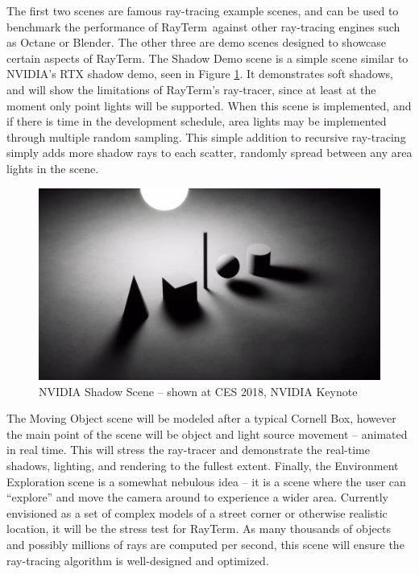 \documentclass[11pt]{article}
\newcommand{\name}{{\sc RayTerm}}
\begin{document}
The first two scenes are famous ray-tracing example scenes, and can be used to benchmark the performance of \name\ against other ray-tracing engines such as Octane or Blender.
The other three are demo scenes designed to showcase certain aspects of \name.
The Shadow Demo scene is a simple scene similar to NVIDIA's RTX shadow demo, seen in Figure \ref{fig:nvidia_shadows}.
It demonstrates soft shadows, and will show the limitations of \name's ray-tracer, since at least at the moment only point lights will be supported.
When this scene is implemented, and if there is time in the development schedule, area lights may be implemented through multiple random sampling.
This simple addition to recursive ray-tracing simply adds more shadow rays to each scatter, randomly spread between any area lights in the scene.

\begin{figure}[htb]
  \centering
  \includegraphics[width=\textwidth]{resources/nvidia_shadows}
  \caption{NVIDIA Shadow Scene -- shown at CES 2018, NVIDIA Keynote}
  \label{fig:nvidia_shadows}
\end{figure}

The Moving Object scene will be modeled after a typical Cornell Box, however the main point of the scene will be object and light source movement -- animated in real time.
This will stress the ray-tracer and demonstrate the real-time shadows, lighting, and rendering to the fullest extent.
Finally, the Environment Exploration scene is a somewhat nebulous idea -- it is a scene where the user can ``explore'' and move the camera around to experience a wider area.
Currently envisioned as a set of complex models of a street corner or otherwise realistic location, it will be the stress test for \name.
As many thousands of objects and possibly millions of rays are computed per second, this scene will ensure the ray-tracing algorithm is well-designed and optimized.
\end{document}
